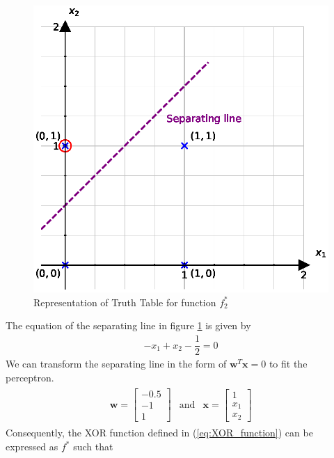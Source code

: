 \begin{figure}[H]
  \centering
  \includegraphics[scale=0.75]{CHAPTER_2/c2_fig_f_2_XOR_python.eps}
  \caption{Representation of Truth Table for function $f_2^{*}$}
  \label{fig:f2_XOR}
\end{figure}
\noindent The equation of the separating line in figure \ref{fig:f2_XOR} is given by
\begin{align}
  -x_1 + x_2 - \dfrac{1}{2} = 0
\end{align}
We can transform the separating line in the form of $\textbf{w}^T\textbf{x} = 0$ to fit the perceptron.
\begin{align}
  \label{eq: weight_f_2}
  \begin{matrix}
    \textbf{w} = \begin{bmatrix}
      -0.5 \\
      -1 \\
      1
    \end{bmatrix} & \text{and} & \textbf{x} = \begin{bmatrix}
      1 \\
      x_1 \\
      x_2
    \end{bmatrix}
  \end{matrix}
\end{align}
Consequently, the XOR function defined in (\ref{eq:XOR_function}) can be expressed as $f^*$ such that
